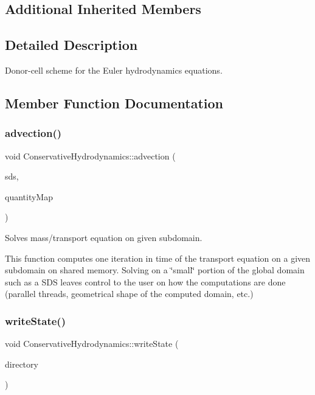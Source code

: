 \subsection*{Additional Inherited Members}


\subsection{Detailed Description}
Donor-\/cell scheme for the Euler hydrodynamics equations. 

\subsection{Member Function Documentation}
\mbox{\label{classConservativeHydrodynamics_a243cd5dc5e3615ec74ce0ccf19ad7908}} 
\subsubsection{\texorpdfstring{advection()}{advection()}}
{\footnotesize\ttfamily void Conservative\+Hydrodynamics\+::advection (\begin{DoxyParamCaption}\item[{const \hyperlink{classSDShared}{S\+D\+Shared} \&}]{sds,  }\item[{std\+::map$<$ std\+::string, \hyperlink{classQuantity}{Quantity}$<$ real $>$ $\ast$ $>$}]{quantity\+Map }\end{DoxyParamCaption})}



Solves mass/transport equation on given subdomain. 

This function computes one iteration in time of the transport equation on a given subdomain on shared memory. Solving on a \char`\"{}small\char`\"{} portion of the global domain such as a S\+DS leaves control to the user on how the computations are done (parallel threads, geometrical shape of the computed domain, etc.) \mbox{\label{classConservativeHydrodynamics_a563052ded453d68f5129ed17777d6671}} 
\subsubsection{\texorpdfstring{write\+State()}{writeState()}\hspace{0.1cm}{\footnotesize\ttfamily [1/2]}}
{\footnotesize\ttfamily void Conservative\+Hydrodynamics\+::write\+State (\begin{DoxyParamCaption}\item[{std\+::string}]{directory }\end{DoxyParamCaption})}



